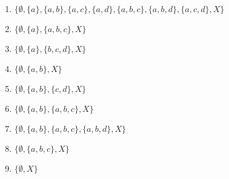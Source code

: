 \begin{enumerate}[1.]
\item $\{\emptyset, \{a\}, \{a,b\}, \{a,c\}, \{a,d\}, \{a,b,c\}, \{a,b,d\}, \{a,c,d\}, X\}$
\item $\{\emptyset, \{a\}, \{a,b,c\}, X\}$
\item $\{\emptyset, \{a\}, \{b,c,d\}, X\}$
\item $\{\emptyset, \{a,b\}, X\}$
\item $\{\emptyset, \{a,b\}, \{c,d\}, X\}$
\item $\{\emptyset, \{a,b\}, \{a,b,c\}, X\}$
\item $\{\emptyset, \{a,b\}, \{a,b,c\}, \{a,b,d\}, X\}$
\item $\{\emptyset, \{a,b,c\}, X\}$
\item $\{\emptyset, X\}$
\end{enumerate}

